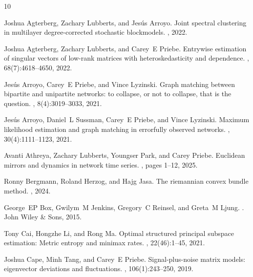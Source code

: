 \documentclass[12pt]{article}
\theoremstyle{definition}
\begin{document}

\begin{thebibliography}{10}

Joshua Agterberg, Zachary Lubberts, and Jes{\'u}s Arroyo.
\newblock Joint spectral clustering in multilayer degree-corrected stochastic blockmodels.
, 2022.

Joshua Agterberg, Zachary Lubberts, and Carey~E Priebe.
\newblock Entrywise estimation of singular vectors of low-rank matrices with heteroskedasticity and dependence.
, 68(7):4618--4650, 2022.

Jes{\'u}s Arroyo, Carey~E Priebe, and Vince Lyzinski.
\newblock Graph matching between bipartite and unipartite networks: to collapse, or not to collapse, that is the question.
, 8(4):3019--3033, 2021.

Jes{\'u}s Arroyo, Daniel~L Sussman, Carey~E Priebe, and Vince Lyzinski.
\newblock Maximum likelihood estimation and graph matching in errorfully observed networks.
, 30(4):1111--1123, 2021.

Avanti Athreya, Zachary Lubberts, Youngser Park, and Carey Priebe.
\newblock Euclidean mirrors and dynamics in network time series.
, pages 1--12, 2025.

Ronny Bergmann, Roland Herzog, and Hajg Jasa.
\newblock The riemannian convex bundle method.
, 2024.

George~EP Box, Gwilym~M Jenkins, Gregory~C Reinsel, and Greta~M Ljung.
.
\newblock John Wiley \& Sons, 2015.

Tony Cai, Hongzhe Li, and Rong Ma.
\newblock Optimal structured principal subspace estimation: Metric entropy and minimax rates.
, 22(46):1--45, 2021.

Joshua Cape, Minh Tang, and Carey~E Priebe.
\newblock Signal-plus-noise matrix models: eigenvector deviations and fluctuations.
, 106(1):243--250, 2019.


\end{thebibliography}
\end{document}
